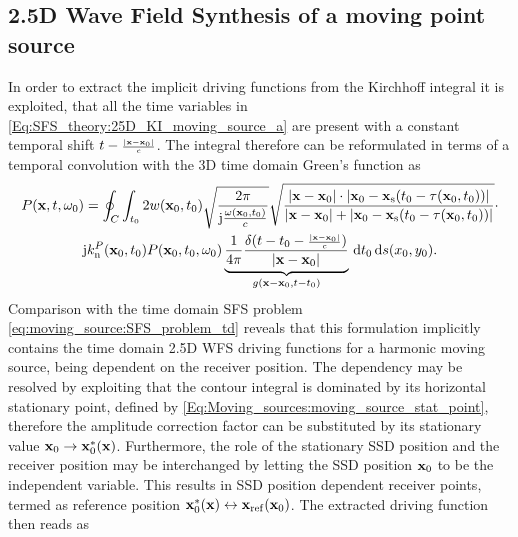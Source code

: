 \subsection{2.5D Wave Field Synthesis of a moving point source}

In order to extract the implicit driving functions from the Kirchhoff integral it is exploited, that all the time variables in \eqref{Eq:SFS_theory:25D_KI_moving_source_a} are present with a constant temporal shift $t-{\scriptstyle \frac{|\mathbf{x}-\mathbf{x}_0|}{c} }$.
The integral therefore can be reformulated in terms of a temporal convolution with the 3D time domain Green's function as
\begin{multline}
P(\vx,t,\omega_0) =
\small
\oint_{C}  \int_{t_0} 2 w(\vxo,t_0 ) 
\sqrt{\frac{2\pi}{\ti\frac{\omega(\vxo,t_0)}{c}}}
\sqrt{\frac{|\vx-\vxo|\cdot|\vxo - \vxs(t_0-\tau(\vxo,t_0))|}{|\vx-\vxo|+|\vxo - \vxs(t_0-\tau(\vxo,t_0))|}} \cdot \\ %
 \ti k_{\mathrm{n}}^P(\vxo,t_0) P(\vxo,t_0,\omega_0)
\underbrace{\frac{1}{4\pi} \frac{ \delta(t-t_0- \Tret) }{|\vx-\vxo|}}_{g(\vx-\vxo,t-t_0)}
\, \td t_0 \, \td s(x_0, y_0).
\label{Eq:SFS_theory:25D_KI_moving_source_2}
\end{multline}
Comparison with the time domain SFS problem \eqref{eq:moving_source:SFS_problem_td} reveals that this formulation implicitly contains the time domain 2.5D WFS driving functions for a harmonic moving source, being dependent on the receiver position.
The dependency may be resolved by exploiting that the contour integral is dominated by its horizontal stationary point, defined by \eqref{Eq:Moving_sources:moving_source_stat_point}, therefore the amplitude correction factor can be substituted by its stationary value $\mathbf{x}_0 \rightarrow \mathbf{x}_0^*(\mathbf{x})$.
Furthermore, the role of the stationary SSD position and the receiver position may be interchanged by letting the SSD position $\mathbf{x}_0$ to be the independent variable.
This results in SSD position dependent receiver points, termed as reference position $\mathbf{x}_0^*(\mathbf{x}) \leftrightarrow \mathbf{x}_{\mathrm{ref}}(\mathbf{x}_0)$.
The extracted driving function then reads as

